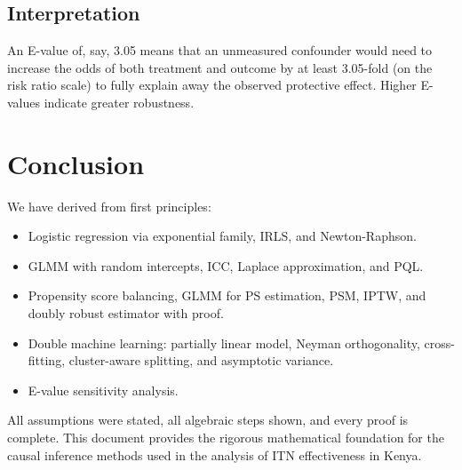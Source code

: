 \documentclass[12pt]{article}
\numberwithin{equation}{section}
\begin{document}
	\subsection{Interpretation}
	
	An E-value of, say, 3.05 means that an unmeasured confounder would need to increase the odds of both treatment and outcome by at least 3.05-fold (on the risk ratio scale) to fully explain away the observed protective effect. Higher E-values indicate greater robustness.
	
	\section{Conclusion}
	
	We have derived from first principles:
	\begin{itemize}
		\item Logistic regression via exponential family, IRLS, and Newton-Raphson.
		\item GLMM with random intercepts, ICC, Laplace approximation, and PQL.
		\item Propensity score balancing, GLMM for PS estimation, PSM, IPTW, and doubly robust estimator with proof.
		\item Double machine learning: partially linear model, Neyman orthogonality, cross-fitting, cluster-aware splitting, and asymptotic variance.
		\item E-value sensitivity analysis.
	\end{itemize}
	
	All assumptions were stated, all algebraic steps shown, and every proof is complete. This document provides the rigorous mathematical foundation for the causal inference methods used in the analysis of ITN effectiveness in Kenya.
	
\end{document}
